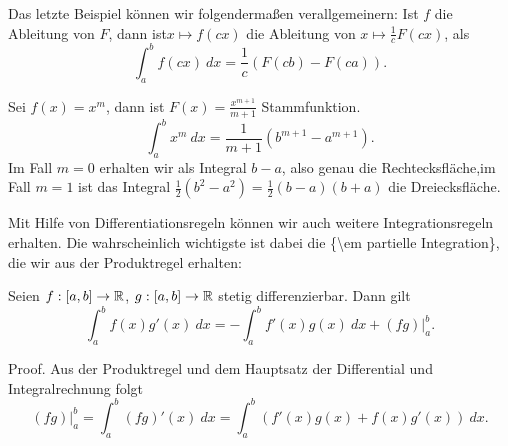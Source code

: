 Das letzte Beispiel können wir folgendermaßen verallgemeinern: Ist \(f\) die Ableitung von \(F\), dann ist\(x \mapsto f(c x)\) die Ableitung von \(x\mapsto \frac{1}c F(cx)\), als
\begin{equation*}
 \int_a^b f(cx)~dx = \frac{1}c (F(cb) - F(ca)).
\end{equation*}\label{integration/hdi:example-5}
\begin{example}{}{}



Sei \(f(x) = x^m\), dann ist \(F(x) = \frac{x^{m+1}}{m+1}\) Stammfunktion.
\begin{equation*}
 \int_a^b x^m ~dx =\frac{1}{m+1}  (b^{m+1} -a^{m+1}).
\end{equation*}
Im Fall \(m=0\) erhalten wir als Integral \(b-a\), also genau die Rechtecksfläche,im Fall \(m=1\) ist das Integral \(\frac{1}2 (b^2-a^2) = \frac{1}2 (b-a)(b+a)\) die Dreiecksfläche.
\end{example}

Mit Hilfe von Differentiationsregeln können wir auch weitere Integrationsregeln erhalten. Die wahrscheinlich
wichtigste ist dabei die \{\textbackslash{}em partielle Integration\}, die wir aus der Produktregel erhalten:
\label{integration/hdi:theorem-6}
\begin{theorem}{}{}



Seien \(f:[a,b] \rightarrow \mathbb{R}\), \(g:[a,b] \rightarrow \mathbb{R}\) stetig differenzierbar. Dann gilt
\begin{equation*}
 \int_a^b f(x) g'(x) ~dx = - \int_a^b f'(x) g(x)~dx + (fg)\vert_a^b.
\end{equation*}\end{theorem}

\begin{emphBox}{}{}
Proof. Aus der Produktregel und dem Hauptsatz der Differential  und Integralrechnung folgt
\begin{equation*}
 (fg)\vert_a^b = \int_a^b (fg)'(x)~dx = \int_a^b (f'(x)g(x) + f(x)g'(x))~dx.
\end{equation*}\end{emphBox}


